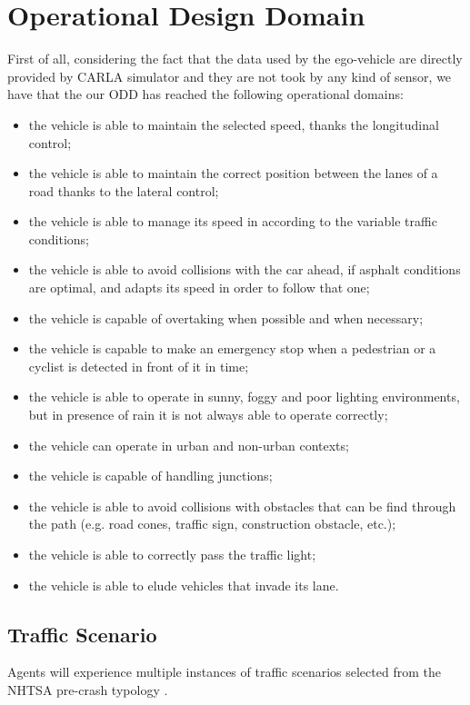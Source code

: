 \documentclass{article}
\begin{document}
\section{Operational Design Domain}
First of all, considering the fact that the data used by the ego-vehicle are directly provided by CARLA simulator and they are not took by any kind of sensor, we have
that the our ODD has reached the following operational domains:
\begin{itemize}
    \item the vehicle is able to maintain the selected speed, thanks the longitudinal control;
    \item the vehicle is able to maintain the correct position between the lanes of a road thanks to the lateral control;
    \item the vehicle is able to manage its speed in according to the variable traffic conditions;
    \item the vehicle is able to avoid collisions with the car ahead, if asphalt conditions are optimal, and adapts its speed in order to follow that one;
    \item the vehicle is capable of overtaking when possible and when necessary;
    \item the vehicle is capable to make an emergency stop when a pedestrian or a cyclist is detected in front of it in time;
    \item the vehicle is able to operate in sunny, foggy and poor lighting environments, but in presence of rain it is not always able to operate correctly;
    \item the vehicle can operate in urban and non-urban contexts;
    \item the vehicle is capable of handling junctions;
    \item the vehicle is able to avoid collisions with obstacles that can be find through the path (e.g. road cones, traffic sign, construction obstacle, etc.);
    \item the vehicle is able to correctly pass the traffic light;
    \item the vehicle is able to elude vehicles that invade its lane.
\end{itemize}

\subsection{Traffic Scenario}
Agents will experience multiple instances of traffic scenarios selected from the NHTSA pre-crash typology \cite{NHTSA}.
\end{document}
